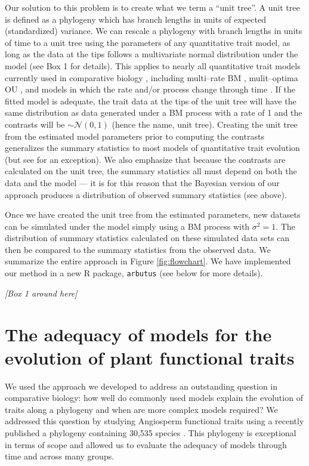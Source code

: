 \documentclass[a4paper,12pt]{article}
\begin{document}
Our solution to this problem is to create what we term a ``unit tree''. A unit tree is defined as a phylogeny which has branch lengths in units of expected (standardized) variance. We can rescale a phylogeny with branch lengths in units of time to a unit tree using the parameters of any quantitative trait model, as long as the data at the tips follows a multivariate normal distribution under the model (see Box 1 for details). This applies to nearly all quantitative trait models currently used in comparative biology \citep{Omeara2012}, including multi--rate BM \citep{Omeara2006, Eastman2011}, mulit--optima OU \citep{ButlerKing2004, Beaulieu2012, IngramMahler, UyedaBayou}, and models in which the rate and/or process change through time \citep{Blomberg2003, SlaterMEE}. If the fitted model is adequate, the trait data at the tips of the unit tree will have the same distribution as data generated under a BM process with a rate of 1 and the contrasts will be $\sim \mathcal{N}(0,1)$ (hence the name, unit tree). Creating the unit tree from the estimated model parameters prior to computing the contrasts generalizes the summary statistics to most models of quantitative trait evolution (but see \citep{Landis2012} for an exception). We also emphasize that because the contrasts are calculated on the unit tree, the summary statistics all must depend on both the data and the model --- it is for this reason that the Bayesian version of our approach produces a distribution of observed summary statistics (see above).

Once we have created the unit tree from the estimated parameters, new datasets can be simulated under the model simply using a BM process with $\sigma^2 = 1$. The distribution of summary statistics calculated on these simulated data sets can then be compared to the summary statistics from the observed data. We summarize the entire approach in Figure \ref{fig:flowchart}. We have implemented our method in a new R package, \texttt{arbutus} (see below for more details). 

\begin{center}
\textit{[Box 1 around here]}
\end{center}

\section{The adequacy of models for the evolution of plant functional traits}

We used the approach we developed to address an outstanding question in comparative biology: how well do commonly used models explain the evolution of traits along a phylogeny and when are more complex models required? We addressed this question by studying Angiosperm functional traits using a recently published a phylogeny containing 30,535 species \citep{Zanne2013}. This phylogeny is exceptional in terms of scope and allowed us to evaluate the adequacy of models through time and across many groups.  
\end{document}
